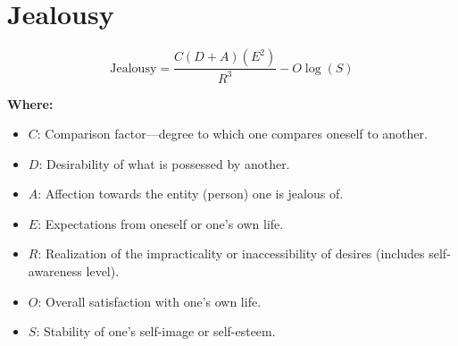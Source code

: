 \chapter{Jealousy}

\begin{equation}
\text{Jealousy} = \frac{C (D + A) (E^2)}{R^3} - O\log(S)
\end{equation}

\textbf{Where:}

\begin{itemize}
    \item $C$: Comparison factor---degree to which one compares oneself to another.
    \item $D$: Desirability of what is possessed by another.
    \item $A$: Affection towards the entity (person) one is jealous of.
    \item $E$: Expectations from oneself or one's own life.
    \item $R$: Realization of the impracticality or inaccessibility of desires (includes self-awareness level).
    \item $O$: Overall satisfaction with one's own life.
    \item $S$: Stability of one’s self-image or self-esteem.
\end{itemize}